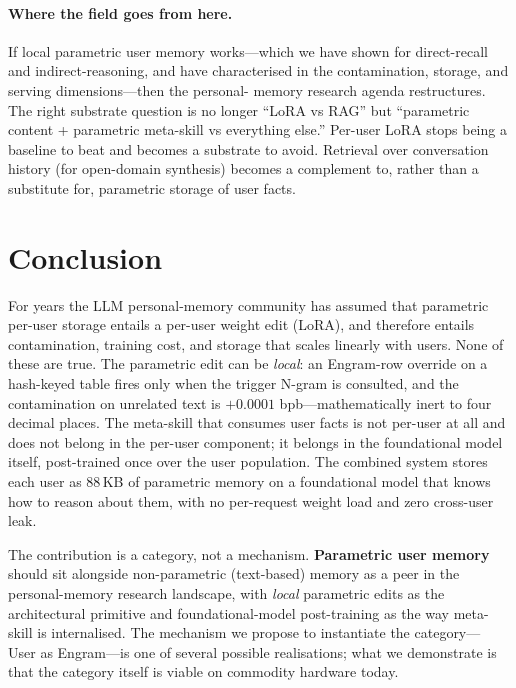\documentclass{article}
\begin{document}
\paragraph{Where the field goes from here.}
If local parametric user memory works—which we have shown for
direct-recall and indirect-reasoning, and have characterised in the
contamination, storage, and serving dimensions—then the personal-
memory research agenda restructures. The right substrate question is
no longer ``LoRA vs RAG'' but ``parametric content + parametric
meta-skill vs everything else.'' Per-user LoRA stops being a baseline
to beat and becomes a substrate to avoid. Retrieval over conversation
history (for open-domain synthesis) becomes a complement to, rather
than a substitute for, parametric storage of user facts.


\section{Conclusion}
\label{sec:conclusion}

For years the LLM personal-memory community has assumed that
parametric per-user storage entails a per-user weight edit
(LoRA), and therefore entails contamination, training cost, and
storage that scales linearly with users. None of these are true. The
parametric edit can be \emph{local}: an Engram-row override on a
hash-keyed table fires only when the trigger N-gram is consulted, and
the contamination on unrelated text is $+0.0001$ bpb—mathematically
inert to four decimal places. The meta-skill that consumes user facts
is not per-user at all and does not belong in the per-user component;
it belongs in the foundational model itself, post-trained once over
the user population. The combined system stores each user as 88\,KB
of parametric memory on a foundational model that knows how to reason
about them, with no per-request weight load and zero cross-user leak.

The contribution is a category, not a mechanism. \textbf{Parametric
user memory} should sit alongside non-parametric (text-based)
memory as a peer in the personal-memory research landscape, with
\emph{local} parametric edits as the architectural primitive and
foundational-model post-training as the way meta-skill is
internalised. The mechanism we propose to instantiate the category—
User as Engram—is one of several possible realisations; what we
demonstrate is that the category itself is viable on commodity
hardware today.
\end{document}
